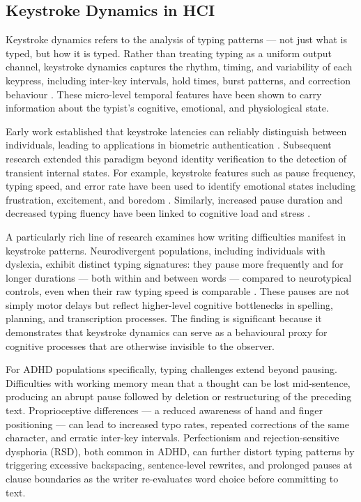 \subsection{Keystroke Dynamics in HCI}

Keystroke dynamics refers to the analysis of typing patterns --- not just what is typed, but how it is typed. Rather than treating typing as a uniform output channel, keystroke dynamics captures the rhythm, timing, and variability of each keypress, including inter-key intervals, hold times, burst patterns, and correction behaviour \parencite{epp2011identifying}. These micro-level temporal features have been shown to carry information about the typist's cognitive, emotional, and physiological state.

Early work established that keystroke latencies can reliably distinguish between individuals, leading to applications in biometric authentication \parencite{joyce1990identity}. Subsequent research extended this paradigm beyond identity verification to the detection of transient internal states. For example, keystroke features such as pause frequency, typing speed, and error rate have been used to identify emotional states including frustration, excitement, and boredom \parencite{epp2011identifying}. Similarly, increased pause duration and decreased typing fluency have been linked to cognitive load and stress \parencite{vizer2009automated}.

A particularly rich line of research examines how writing difficulties manifest in keystroke patterns. Neurodivergent populations, including individuals with dyslexia, exhibit distinct typing signatures: they pause more frequently and for longer durations --- both within and between words --- compared to neurotypical controls, even when their raw typing speed is comparable \parencite{sumner2013children}. These pauses are not simply motor delays but reflect higher-level cognitive bottlenecks in spelling, planning, and transcription processes. The finding is significant because it demonstrates that keystroke dynamics can serve as a behavioural proxy for cognitive processes that are otherwise invisible to the observer.

For ADHD populations specifically, typing challenges extend beyond pausing. Difficulties with working memory mean that a thought can be lost mid-sentence, producing an abrupt pause followed by deletion or restructuring of the preceding text. Proprioceptive differences --- a reduced awareness of hand and finger positioning --- can lead to increased typo rates, repeated corrections of the same character, and erratic inter-key intervals. Perfectionism and rejection-sensitive dysphoria (RSD), both common in ADHD, can further distort typing patterns by triggering excessive backspacing, sentence-level rewrites, and prolonged pauses at clause boundaries as the writer re-evaluates word choice before committing to text.


